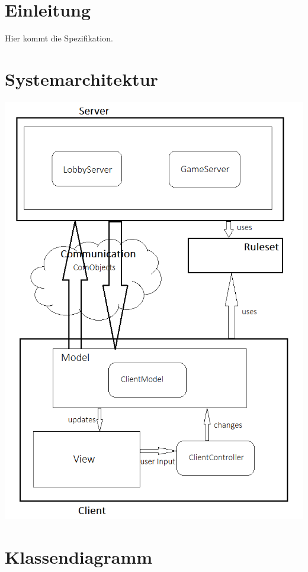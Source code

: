 \documentclass{article}
\begin{document}
\tableofcontents
\newpage

\section{Einleitung}
Hier kommt die Spezifikation.
\  \\


\section{Systemarchitektur}
\includegraphics[width=\textwidth]{ArchitekturDiagramm}
\newpage

\section{Klassendiagramm}
\end{document}
